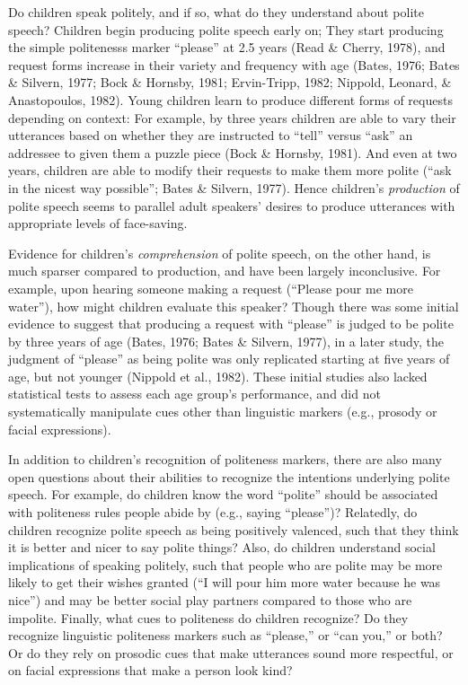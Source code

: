 \documentclass[10pt, letterpaper]{article}
\begin{document}
Do children speak politely, and if so, what do they understand about
polite speech? Children begin producing polite speech early on; They
start producing the simple politenesss marker ``please'' at 2.5 years
(Read \& Cherry, 1978), and request forms increase in their variety and
frequency with age (Bates, 1976; Bates \& Silvern, 1977; Bock \&
Hornsby, 1981; Ervin-Tripp, 1982; Nippold, Leonard, \& Anastopoulos,
1982). Young children learn to produce different forms of requests
depending on context: For example, by three years children are able to
vary their utterances based on whether they are instructed to ``tell''
versus ``ask'' an addressee to given them a puzzle piece (Bock \&
Hornsby, 1981). And even at two years, children are able to modify their
requests to make them more polite (``ask in the nicest way possible'';
Bates \& Silvern, 1977). Hence children's \emph{production} of polite
speech seems to parallel adult speakers' desires to produce utterances
with appropriate levels of face-saving.

Evidence for children's \emph{comprehension} of polite speech, on the
other hand, is much sparser compared to production, and have been
largely inconclusive. For example, upon hearing someone making a request
(``Please pour me more water''), how might children evaluate this
speaker? Though there was some initial evidence to suggest that
producing a request with ``please'' is judged to be polite by three
years of age (Bates, 1976; Bates \& Silvern, 1977), in a later study,
the judgment of ``please'' as being polite was only replicated starting
at five years of age, but not younger (Nippold et al., 1982). These
initial studies also lacked statistical tests to assess each age group's
performance, and did not systematically manipulate cues other than
linguistic markers (e.g., prosody or facial expressions).

In addition to children's recognition of politeness markers, there are
also many open questions about their abilities to recognize the
intentions underlying polite speech. For example, do children know the
word ``polite'' should be associated with politeness rules people abide
by (e.g., saying ``please'')? Relatedly, do children recognize polite
speech as being positively valenced, such that they think it is better
and nicer to say polite things? Also, do children understand social
implications of speaking politely, such that people who are polite may
be more likely to get their wishes granted (``I will pour him more water
because he was nice'') and may be better social play partners compared
to those who are impolite. Finally, what cues to politeness do children
recognize? Do they recognize linguistic politeness markers such as
``please,'' or ``can you,'' or both? Or do they rely on prosodic cues
that make utterances sound more respectful, or on facial expressions
that make a person look kind?
\end{document}
